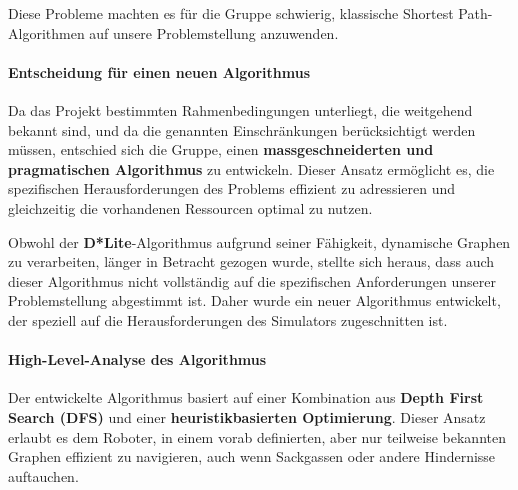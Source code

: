\documentclass[main.tex]{subfiles} %
\begin{document}
Diese Probleme machten es für die Gruppe schwierig, klassische Shortest Path-Algorithmen auf unsere Problemstellung anzuwenden.

\paragraph{Entscheidung für einen neuen Algorithmus}

Da das Projekt bestimmten Rahmenbedingungen unterliegt, die weitgehend bekannt sind, und da die genannten Einschränkungen berücksichtigt werden müssen, entschied sich die Gruppe, einen \textbf{massgeschneiderten und pragmatischen Algorithmus} zu entwickeln. Dieser Ansatz ermöglicht es, die spezifischen Herausforderungen des Problems effizient zu adressieren und gleichzeitig die vorhandenen Ressourcen optimal zu nutzen.

Obwohl der \textbf{D*Lite}-Algorithmus aufgrund seiner Fähigkeit, dynamische Graphen zu verarbeiten, länger in Betracht gezogen wurde, stellte sich heraus, dass auch dieser Algorithmus nicht vollständig auf die spezifischen Anforderungen unserer Problemstellung abgestimmt ist. Daher wurde ein neuer Algorithmus entwickelt, der speziell auf die Herausforderungen des Simulators zugeschnitten ist.

\paragraph{High-Level-Analyse des Algorithmus}

Der entwickelte Algorithmus basiert auf einer Kombination aus \textbf{Depth First Search (DFS)} und einer \textbf{heuristikbasierten Optimierung}. Dieser Ansatz erlaubt es dem Roboter, in einem vorab definierten, aber nur teilweise bekannten Graphen effizient zu navigieren, auch wenn Sackgassen oder andere Hindernisse auftauchen.
\end{document}
